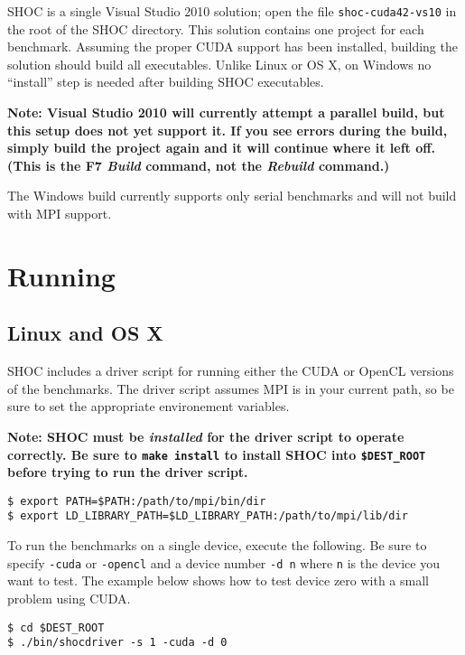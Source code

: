 \documentclass[11pt]{article}
\begin{document}
SHOC is a single Visual Studio 2010 solution; open
the file {\tt shoc-cuda42-vs10} in the root 
of the SHOC directory.  This solution contains
one project for each benchmark.  Assuming
the proper CUDA support has been installed,
building the solution should build all executables.
Unlike Linux or OS X, on Windows no ``install'' step is needed after building
SHOC executables.

{\bf Note: Visual Studio 2010 will currently attempt
a parallel build, but this setup does not yet
support it.  If you see errors during the build,
simply build the project again and it will 
continue where it left off.  (This is
the F7 {\it Build} command, not the {\it Rebuild}
command.)}

The Windows build currently supports only serial
benchmarks and will not build with MPI support.

\section{Running}\label{sec:running}

\subsection{Linux and OS X}

SHOC includes a driver script for running either the CUDA or OpenCL versions
of the benchmarks. The driver script assumes MPI is in your current path,
so be sure to set the appropriate environement variables.

{\bf Note: SHOC must be {\em installed} for the driver script to operate
correctly.  Be sure to \verb+make install+ to install SHOC into 
\verb+$DEST_ROOT+ before trying to run the driver script.}

\begin{Verbatim}[frame=single]
$ export PATH=$PATH:/path/to/mpi/bin/dir
$ export LD_LIBRARY_PATH=$LD_LIBRARY_PATH:/path/to/mpi/lib/dir
\end{Verbatim}

To run the benchmarks on a single device, execute the following. Be sure
to specify \verb+-cuda+ or \verb+-opencl+ and a device number \verb+-d n+
where \verb+n+ is the device you want to test. The example below shows how
to test device zero with a small problem using CUDA.

\begin{Verbatim}[frame=single]
$ cd $DEST_ROOT
$ ./bin/shocdriver -s 1 -cuda -d 0
\end{Verbatim}
\end{document}
